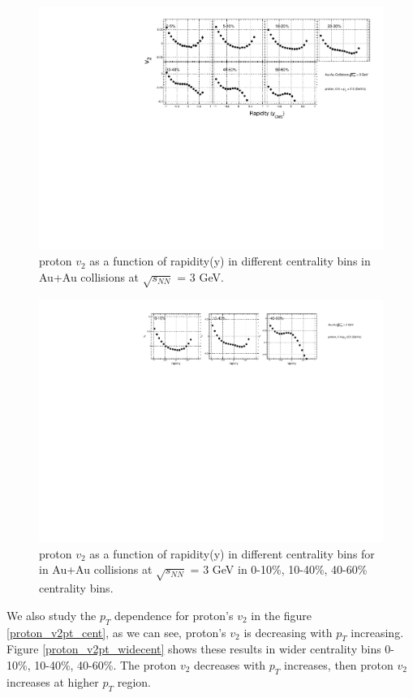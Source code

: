\begin{figure}[h]
\includegraphics[scale=0.6]{chapter3/fig/v2ypikp/v2y_cent_proton.pdf}
\caption{proton $v_{2}$ as a function of rapidity(y) in different centrality bins in Au+Au collisions at $\sqrt{s_{NN}}$ = 3 GeV.}
\label{proton_v2y_cent}
\end{figure}

\begin{figure}[h]
\includegraphics[scale=0.6]{chapter3/fig/v2ypikp/protonp_v2y_wide_cent.pdf}
\caption{proton $v_{2}$ as a function of rapidity(y) in different centrality bins for in Au+Au collisions at $\sqrt{s_{NN}}$ = 3 GeV in 0-10\%, 10-40\%, 40-60\% centrality bins.}
\label{proton_v2y_widecent}
\end{figure}

We also study the $p_{T}$ dependence for proton's $v_{2}$ in the figure \ref{proton_v2pt_cent}, as we can see, proton's $v_{2}$ is decreasing with $p_{T}$ increasing. Figure \ref{proton_v2pt_widecent} shows these results in wider centrality bins 0-10\%, 10-40\%, 40-60\%. The proton $v_{2}$ decreases with $p_{T}$ increases, then proton $v_{2}$ increases at higher $p_{T}$ region.


